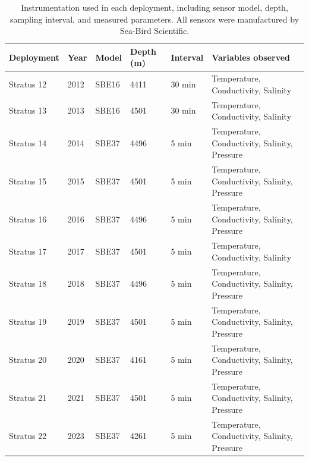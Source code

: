 \begin{table}[ht]
\centering
\caption{Instrumentation used in each deployment, including sensor model, depth, sampling interval, and measured parameters. All sensors were manufactured by Sea-Bird Scientific\protect\footnotemark.}
\label{tab:instruments}
\begin{tabular}{llllll}
\toprule
\textbf{Deployment} & \textbf{Year} & \textbf{Model} & \textbf{Depth (m)} & \textbf{Interval} & \textbf{Variables observed} \\
\midrule
Stratus 12 & 2012 & SBE16 & 4411 & 30 min & Temperature, Conductivity, Salinity \\
Stratus 13 & 2013 & SBE16 & 4501 & 30 min & Temperature, Conductivity, Salinity \\
Stratus 14 & 2014 & SBE37 & 4496 & 5 min & Temperature, Conductivity, Salinity, Pressure \\
Stratus 15 & 2015 & SBE37 & 4501 & 5 min & Temperature, Conductivity, Salinity, Pressure \\
Stratus 16 & 2016 & SBE37 & 4496 & 5 min & Temperature, Conductivity, Salinity, Pressure \\
Stratus 17 & 2017 & SBE37 & 4501 & 5 min & Temperature, Conductivity, Salinity \\
Stratus 18 & 2018 & SBE37 & 4496 & 5 min & Temperature, Conductivity, Salinity, Pressure \\
Stratus 19 & 2019 & SBE37 & 4501 & 5 min & Temperature, Conductivity, Salinity, Pressure \\
Stratus 20 & 2020 & SBE37 & 4161 & 5 min & Temperature, Conductivity, Salinity, Pressure \\
Stratus 21 & 2021 & SBE37 & 4501 & 5 min & Temperature, Conductivity, Salinity, Pressure \\
Stratus 22 & 2023 & SBE37 & 4261 & 5 min & Temperature, Conductivity, Salinity, Pressure \\
\bottomrule
\end{tabular}
\end{table}